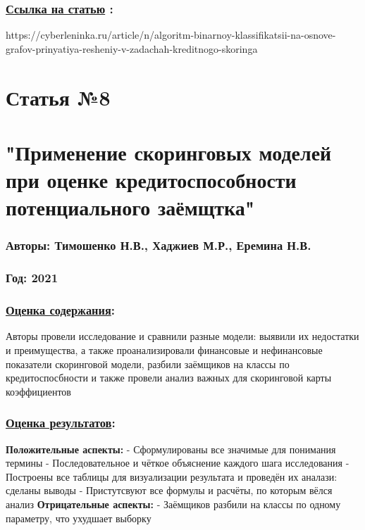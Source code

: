\documentclass[a4paper,14pt]{article}
\begin{document}
\subsubsection*{\underline{Ссылка на статью} :}
https://cyberleninka.ru/article/n/algoritm-binarnoy-klassifikatsii-na-osnove-grafov-prinyatiya-resheniy-v-zadachah-kreditnogo-skoringa


\newpage


\section*{Статья №8}
\section*{"Применение скоринговых моделей при оценке кредитоспособности потенциального заёмщтка"}
\subsubsection*{Авторы: Тимошенко Н.В., Хаджиев М.Р., Еремина Н.В.}
\subsubsection*{Год: 2021}
\subsubsection*{\underline{Оценка содержания}:}
Авторы провели исследование и сравнили разные модели: выявили их недостатки и преимущества, а также проанализировали финансовые и нефинансовые показатели скоринговой модели, разбили заёмщиков на классы по кредитоспосбности и также провели анализ важных для скоринговой карты коэффициентов\newline
\subsubsection*{\underline{Оценка результатов}:}
\textbf{Положительные аспекты:} \newline
- Сформулированы все значимые для понимания термины \newline
- Последовательное и чёткое объяснение каждого шага исследования \newline
- Построены все таблицы для визуализации результата и проведён их аналази: сделаны выводы \newline
- Пристутсвуют все формулы и расчёты, по которым вёлся анализ \newline
\textbf{Отрицательные аспекты:} \newline
- Заёмщиков разбили на классы по одному параметру, что ухудшает выборку
\end{document}
